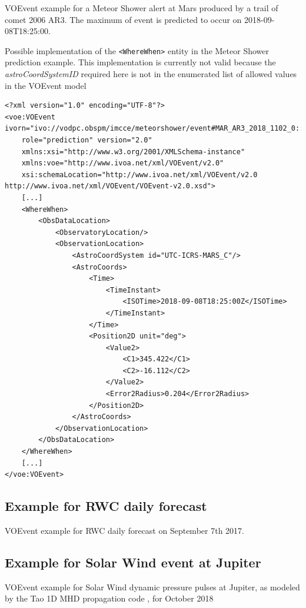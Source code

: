 \documentclass[referee,a4paper,12pt,traditabstract]{swsc}
\begin{document}
\begin{linenumbers}
VOEvent example for a Meteor Shower alert at Mars produced by a trail of comet 2006 AR3. The maximum of event is predicted to occur on 2018-09-08T18:25:00.

{\tiny 

}

Possible implementation of the {\tt <WhereWhen>} entity in the Meteor Shower prediction example. This implementation is currently not valid because the \emph{astroCoordSystemID} required here is not in the enumerated list of allowed values in the VOEvent model

{\tiny 
\begin{verbatim}
<?xml version="1.0" encoding="UTF-8"?>
<voe:VOEvent ivorn="ivo://vodpc.obspm/imcce/meteorshower/event#MAR_AR3_2018_1102_0::v1.0"
    role="prediction" version="2.0"
    xmlns:xsi="http://www.w3.org/2001/XMLSchema-instance"
    xmlns:voe="http://www.ivoa.net/xml/VOEvent/v2.0"
    xsi:schemaLocation="http://www.ivoa.net/xml/VOEvent/v2.0 http://www.ivoa.net/xml/VOEvent/VOEvent-v2.0.xsd">
    [...]
    <WhereWhen>
        <ObsDataLocation>
            <ObservatoryLocation/>
            <ObservationLocation>
                <AstroCoordSystem id="UTC-ICRS-MARS_C"/>
                <AstroCoords>
                    <Time>
                        <TimeInstant>
                            <ISOTime>2018-09-08T18:25:00Z</ISOTime>
                        </TimeInstant>
                    </Time>
                    <Position2D unit="deg">
                        <Value2>
                            <C1>345.422</C1>
                            <C2>-16.112</C2>
                        </Value2>
                        <Error2Radius>0.204</Error2Radius>
                    </Position2D>
                </AstroCoords>
            </ObservationLocation>
        </ObsDataLocation>
    </WhereWhen>
    [...]
</voe:VOEvent>
\end{verbatim}
}

\subsection{Example for RWC daily forecast}
\label{appendix-xml-voevent-rwc}

VOEvent example for RWC daily forecast on September 7th 2017.

{\tiny 

}

\subsection{Example for Solar Wind event at Jupiter}
\label{appendix-xml-voevent-tao}
VOEvent example for Solar Wind dynamic pressure pulses at Jupiter, as modeled by the Tao 1D MHD propagation code \cite{Tao:2005dp}, for October 2018


\end{linenumbers}
\end{document}
